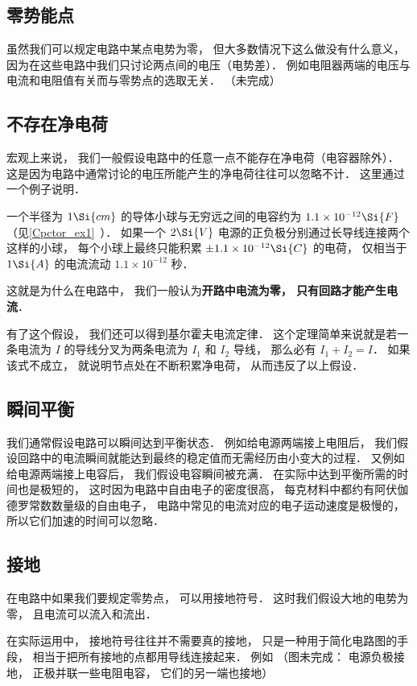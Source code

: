 

\subsection{零势能点}
虽然我们可以规定电路中某点电势为零， 但大多数情况下这么做没有什么意义， 因为在这些电路中我们只讨论两点间的电压（电势差）． 例如电阻器两端的电压与电流和电阻值有关而与零势点的选取无关．
（未完成）

\subsection{不存在净电荷}
宏观上来说， 我们一般假设电路中的任意一点不能存在净电荷（电容器除外）． 这是因为电路中通常讨论的电压所能产生的净电荷往往可以忽略不计． 这里通过一个例子说明．

\begin{example}{}
一个半径为 $1\Si{cm}$ 的导体小球与无穷远之间的电容约为 $1.1\times 10^{-12} \Si{F}$（见\autoref{Cpctor_ex1}~）． 如果一个 $2\Si{V}$ 电源的正负极分别通过长导线连接两个这样的小球， 每个小球上最终只能积累 $\pm 1.1\times 10^{-12} \Si{C}$ 的电荷， 仅相当于 $1\Si{A}$ 的电流流动 $1.1\times 10^{-12}$ 秒．
\end{example}
这就是为什么在电路中， 我们一般认为\textbf{开路中电流为零， 只有回路才能产生电流}．

有了这个假设， 我们还可以得到基尔霍夫电流定律． 这个定理简单来说就是若一条电流为 $I$ 的导线分叉为两条电流为 $I_1$ 和 $I_2$ 导线， 那么必有 $I_1 + I_2 = I$． 如果该式不成立， 就说明节点处在不断积累净电荷， 从而违反了以上假设．

\subsection{瞬间平衡}
我们通常假设电路可以瞬间达到平衡状态． 例如给电源两端接上电阻后， 我们假设回路中的电流瞬间就能达到最终的稳定值而无需经历由小变大的过程． 又例如给电源两端接上电容后， 我们假设电容瞬间被充满． 在实际中达到平衡所需的时间也是极短的， 这时因为电路中自由电子的密度很高， 每克材料中都约有阿伏伽德罗常数数量级的自由电子， 电路中常见的电流对应的电子运动速度是极慢的， 所以它们加速的时间可以忽略．

\subsection{接地}
在电路中如果我们要规定零势点， 可以用接地符号． 这时我们假设大地的电势为零， 且电流可以流入和流出．

在实际运用中， 接地符号往往并不需要真的接地， 只是一种用于简化电路图的手段， 相当于把所有接地的点都用导线连接起来． 例如
（图未完成： 电源负极接地， 正极并联一些电阻电容， 它们的另一端也接地）
